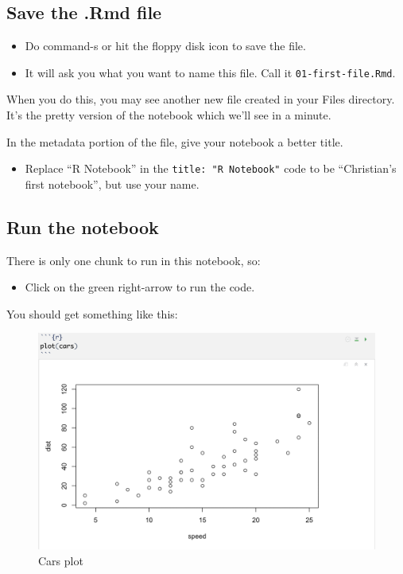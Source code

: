 \documentclass[]{book}
\providecommand{\tightlist}{%
  \setlength{\itemsep}{0pt}\setlength{\parskip}{0pt}}
\begin{document}
\subsection{Save the .Rmd file}\label{save-the-.rmd-file}

\begin{itemize}
\tightlist
\item
  Do command-s or hit the floppy disk icon to save the file.
\item
  It will ask you what you want to name this file. Call it
  \texttt{01-first-file.Rmd}.
\end{itemize}

When you do this, you may see another new file created in your Files
directory. It's the pretty version of the notebook which we'll see in a
minute.

In the metadata portion of the file, give your notebook a better title.

\begin{itemize}
\tightlist
\item
  Replace ``R Notebook'' in the \texttt{title:\ "R\ Notebook"} code to
  be ``Christian's first notebook'', but use your name.
\end{itemize}

\subsection{Run the notebook}\label{run-the-notebook}

There is only one chunk to run in this notebook, so:

\begin{itemize}
\tightlist
\item
  Click on the green right-arrow to run the code.
\end{itemize}

You should get something like this:

\begin{figure}
\centering
\includegraphics[width=6.25000in]{_images/02-rstudio-defaultplot.png}
\caption{Cars plot}
\end{figure}
\end{document}
